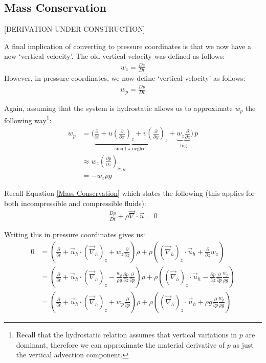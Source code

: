 \subsection{Mass Conservation}

[DERIVATION UNDER CONSTRUCTION]

A final implication of converting to pressure coordinates is that we now have a new `vertical velocity'. The old vertical velocity was defined as follows:
\begin{align*}
    w_z = \frac{D z}{Dt}
\end{align*}
However, in pressure coordinates, we now define `vertical velocity' as follows:
\begin{align*}
    w_p = \frac{D p}{Dt}
\end{align*}

Again, assuming that the system is hydrostatic allows us to approximate $w_p$ the following way\footnote{
    Recall that the hydrostatic relation assumes that vertical variations in $p$ are dominant, therefore we can approximate the material derivative of $p$ as just the vertical advection component.
}:
\begin{align*}
    w_p &= \biggl( \underbrace{\frac{\partial }{\partial t} + u\left( \frac{\partial}{\partial x} \right)_{z}+v\left( \frac{\partial}{\partial y} \right)_{z}}_{\text{small }\therefore \text{ neglect}}+\underbrace{w_z \frac{\partial}{\partial z}}_{\text{big}} \biggr)\, p
    \\
    &\approx w_z \left( \frac{\partial p}{\partial z} \right)_{x,y}
    \\
    & = -w_z\rho g
\end{align*}

Recall Equation \ref{Mass Conservation} which states the following (this applies for both incompressible and compressible fluids):
\begin{align*}
    \frac{D\rho}{Dt}+\rho\vec{\nabla}\cdot\vec{u}=0
\end{align*}

Writing this in pressure coordinates gives us:
\begin{align*}
    0&=\left( 
        \frac{\partial}{\partial t} 
        + \vec{u}_h \cdot \left( \vec{\nabla}_h \right)_z
        + w_z \frac{\partial}{\partial z}
    \right)\rho
    + \rho \left( 
        \left( \vec{\nabla}_h  \right)_z \cdot \vec{u}_h
        + \frac{\partial}{\partial z}w_z
    \right)
    \\
    &=\left( 
        \frac{\partial}{\partial t} 
        + \vec{u}_h \cdot \left( \vec{\nabla}_h \right)_z
        - \frac{w_p}{\rho g} \frac{\partial p}{\partial z}\frac{\partial}{\partial p}
    \right)\rho
    + \rho \left( 
        \left( \vec{\nabla}_h  \right)_z \cdot \vec{u}_h
        - \frac{\partial p}{\partial z} \frac{\partial}{\partial p} \frac{w_p}{\rho g}
    \right)
    \\
    &=\left( 
        \frac{\partial}{\partial t} 
        + \vec{u}_h \cdot \left( \vec{\nabla}_h \right)_z
        + w_p \frac{\partial}{\partial p}
    \right)\rho
    + \rho \left( 
        \left( \vec{\nabla}_h  \right)_z \cdot \vec{u}_h
        +\rho g \frac{\partial}{\partial p} \frac{w_p}{\rho g}
    \right)
\end{align*}


